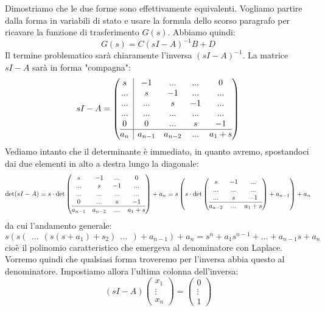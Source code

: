 \documentclass[a4paper,11pt]{article}
\begin{document}
Dimostriamo che le due forme sono effettivamente equivalenti.
Vogliamo partire dalla forma in variabili di stato e usare la formula dello scorso paragrafo per ricavare la funzione di trasferimento $G(s)$.
Abbiamo quindi:
$$
G(s) = C(sI - A)^{-1} B + D
$$
Il termine problematico sarà chiaramente l'inversa $(sI - A)^{-1}$.
La matrice $sI - A$ sarà in forma "compagna":
$$
sI - A = 
\left(\begin{array}{@{}c | cccc@{}}
	s & -1 & ... & ... & 0 \\
	... & s & -1 & ... & ... \\
	... & ... & s & -1 & ... \\ 
	... & ... & ... & ... & ... \\
	0 & 0 & ... & s & -1 \\
	\hline
	a_n & a_{n - 1} & a_{n - 2} & ... & a_1 + s
\end{array}\right)
$$
Vediamo intanto che il determinante è immediato, in quanto avremo, spostandoci dai due elementi in alto a destra lungo la diagonale:
$$
\det(sI - A) = s \cdot \det 
\left(\begin{array}{@{}cccc@{}}
	 s & -1 & ... & 0 \\
	 ... & s & -1 & ... \\
	 ... & ... & ... & ... \\
	 0 & ... & s & -1 \\
	\hline
	 a_{n - 1} & a_{n - 2} & ... & a_1 + s
\end{array}\right) 
+ a_n = s \left( s \cdot \det 
\left(\begin{array}{@{}ccc@{}}
	   s & -1 & ... \\
		 ... & ... & ... \\
	  ... & s & -1 \\
	\hline
		a_{n - 2} & ... & a_1 + s
\end{array}\right)
+ a_{n - 1} \right) + a_n
$$
da cui l'andamento generale:
$$
s \left( s\left( \ \  ... \ \  \left( s(s + a_1) + s_2 \right) \ \  ... \ \  \right) + a_{n - 1} \right) + a_n = s^n + a_1 s^{n - 1} + ... + a_{n - 1} s + a_n
$$
cioè il polinomio caratteristico che emergeva al denominatore con Laplace.
Vorremo quindi che qualsiasi forma troveremo per l'inversa abbia questo al denominatore.
Impostiamo allora l'ultima colonna dell'inversa:
$$
(sI - A) \begin{pmatrix}
	x_1 \\ \vdots \\ x_n
\end{pmatrix} =
\begin{pmatrix}
0 \\ \vdots \\  1
\end{pmatrix}
$$
\end{document}
